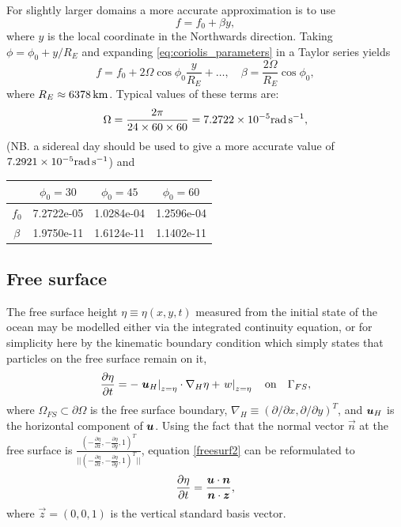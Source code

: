 For slightly larger domains a more accurate approximation is to use
\begin{equation}\label{eq:beta-plane}
f = f_0 + \beta y,
\end{equation}
where $y$ is the local coordinate in the Northwards direction.
Taking $\phi = \phi_0 + y/R_E$ and expanding \eqref{eq:coriolis_parameters} 
in a Taylor series yields
\begin{equation*}
f = f_0 +2\Omega\cos\phi_0\frac{y}{R_E}+\ldots,\quad \beta = \frac{2\Omega}{R_E}\cos\phi_0,
\end{equation*}
where $R_E\approx\unit[6378]{km}$. Typical values of these terms are: 
\begin{equation*}
\Omega = \frac{2\pi}{24\times 60\times 60} = 7.2722\times 10^{-5}\rads[],
\end{equation*}
(NB. a sidereal day should be used to give a more accurate value of $7.2921\times 10^{-5}\rads[]$)
and
\begin{center}\begin{small}
\begin{tabular}{c|ccc}
  &  $\phi_0 = 30$ & $\phi_0=45$ & $\phi_0 = 60$ \\  \hline
 $f_0$  & 7.2722e-05 & 1.0284e-04 & 1.2596e-04 \\
 $\beta$  & 1.9750e-11  &  1.6124e-11  &  1.1402e-11 \\
\end{tabular}\end{small}
\end{center}


\subsection{Free surface}\label{Sect:FS}
The free surface height $\eta\equiv\eta(x,y,t)$ measured from the initial state of the ocean
may be modelled either via the integrated continuity equation,
or for simplicity here by the kinematic boundary condition which simply states
that particles on the free surface remain on it, \ie
\begin{equation}\label{freesurf2}
\frac{\partial \eta}{\partial t}=-\left.{{\mbox{\boldmath$u$}}}_H\right|_{z=\eta}\cdot\nabla_H \eta +\left.w\right|_{z=\eta} \quad \textrm{on}\quad \Gamma_{FS},
\end{equation}
where $\Omega_{FS}\subset \partial \Omega$ is the free surface boundary, $\nabla_H\equiv(\partial/\partial x,\partial/\partial y)^T$, and
${\mbox{\boldmath$u$}}_H$ is the horizontal component of ${\mbox{\boldmath$u$}}$. Using the fact that the normal vector $\vec n$ at the free surface is $\frac{(-\frac{\partial \eta}{\partial x},-\frac{\partial \eta}{\partial y}, 1)^T}{||(-\frac{\partial \eta}{\partial x},-\frac{\partial \eta}{\partial y}, 1)^T||}$, equation \eqref{freesurf2} can be reformulated to
\begin{equation}\label{freesurf3}
\frac{\partial \eta}{\partial t}=\frac{{\mbox{\boldmath$u$}} \cdot {\mbox{\boldmath$n$}}}{{\mbox{\boldmath$n$}} \cdot {\mbox{\boldmath$z$}}},
\end{equation}
where $\vec z=(0,0,1)$ is the vertical standard basis vector.

